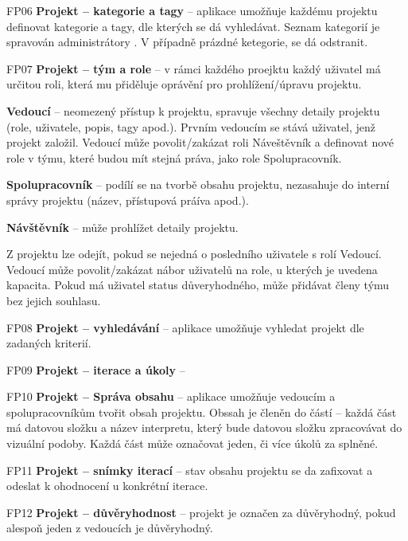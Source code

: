\begin{dl}
\begin{ul}
   \end{ul}
   \item[FP06] \textbf{Projekt – kategorie a tagy} – aplikace umožňuje každému projektu definovat kategorie a tagy, dle kterých se dá vyhledávat.
   Seznam kategorií je spravován administrátory .
   V případně prázdné ketegorie, se dá odstranit.
   \item[FP07] \textbf{Projekt – tým a role} – v rámci každého proejktu každý uživatel má určitou roli, která mu přiděluje oprávění pro prohlížení/úpravu projektu.
   \begin{ul}
      \item {\textbf{Vedoucí} – neomezený přístup k projektu, spravuje všechny detaily projektu (role, uživatele, popis, tagy apod.). Prvním vedoucím se stává uživatel, jenž projekt založil. Vedoucí může povolit/zakázat roli Náveštěvník a definovat nové role v týmu, které budou mít stejná práva, jako role Spolupracovník.}
      \item {\textbf{Spolupracovník} – podílí se na tvorbě obsahu projektu, nezasahuje do interní správy projektu (název, přístupová práíva apod.).}
      \item {\textbf{Návštěvník} – může prohlížet detaily projektu.}
   \end{ul}
   Z projektu lze odejít, pokud se nejedná o posledního uživatele s rolí Vedoucí.
   Vedoucí může povolit/zakázat nábor uživatelů na role, u kterých je uvedena kapacita.
   Pokud má uživatel status důveryhodného, může přidávat členy týmu bez jejich souhlasu.
   \item[FP08] \textbf{Projekt – vyhledávání} – aplikace umožňuje vyhledat projekt dle zadaných kriterií.
   \item[FP09] \textbf{Projekt – iterace a úkoly} –
   \item[FP10] \textbf{Projekt – Správa obsahu} – aplikace umožňuje vedoucím a spolupracovníkům tvořit obsah projektu.
   Obssah je členěn do částí – každá část má datovou složku a název interpretu, který bude datovou složku zpracovávat do vizuální podoby.
   Každá část může označovat jeden, či více úkolů za splněné.
   \item[FP11] \textbf{Projekt – snímky iterací} – stav obsahu projektu se da zafixovat a odeslat k ohodnocení u konkrétní iterace.
   \item[FP12] \textbf{Projekt – důvěryhodnost} – projekt je označen za důvěryhodný, pokud alespoň jeden z vedoucích je důvěryhodný.
\end{dl}



